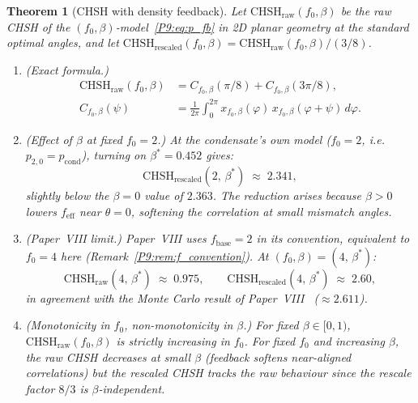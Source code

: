 \documentclass[11pt,a4paper]{article}
\newtheorem{theorem}{Theorem}[section]
\theoremstyle{definition}
\theoremstyle{remark}
\newcommand{\bst}{\beta^{*}}
\newcommand{\pcond}{p_{\mathrm{cond}}}
\newcommand{\CHSH}{\mathrm{CHSH}}
\begin{document}
\begin{theorem}[CHSH with density feedback]
\label{P9:thm:chsh_fb}
Let $\CHSH_\mathrm{raw}(f_0,\beta)$ be the raw CHSH of the
$(f_0,\beta)$-model~\eqref{P9:eq:p_fb} in 2D planar geometry at the
standard optimal angles, and let
$\CHSH_\mathrm{rescaled}(f_0,\beta) = \CHSH_\mathrm{raw}(f_0,\beta)/(3/8)$.
 
\begin{enumerate}[label=\emph{(\roman*)}]
\item \emph{(Exact formula.)}
  \begin{align}
    \CHSH_\mathrm{raw}(f_0,\beta)
    &= C_{f_0,\beta}(\pi/8) + C_{f_0,\beta}(3\pi/8),
    \label{P9:eq:chsh_fb_formula}\\
    C_{f_0,\beta}(\psi)
    &= \frac{1}{2\pi}\int_0^{2\pi}
       x_{f_0,\beta}(\varphi)\,x_{f_0,\beta}(\varphi+\psi)\,d\varphi.
    \nonumber
  \end{align}
 
\item \emph{(Effect of $\beta$ at fixed $f_0=2$.)}\label{P9:item:beta_effect}
  At the condensate's own model ($f_0=2$, i.e.\ $p_{2,0}=\pcond$),
  turning on $\beta^*=0.452$ gives:
  \begin{equation}
    \CHSH_\mathrm{rescaled}(2,\,\bst)
    \;\approx\; 2.341,
    \label{P9:eq:chsh_beta_pcond}
  \end{equation}
  slightly \emph{below} the $\beta=0$ value of $2.363$.
  The reduction arises because $\beta>0$ lowers $f_\mathrm{eff}$
  near $\theta=0$, softening the correlation at small mismatch angles.
 
\item \emph{(Paper~VIII limit.)}
  Paper~VIII uses $f_\mathrm{base}=2$ in its convention, equivalent to
  $f_0=4$ here (Remark~\ref{P9:rem:f_convention}).
  At $(f_0,\beta) = (4,\,\bst)$:
  \begin{equation}
    \CHSH_\mathrm{raw}(4,\,\bst) \;\approx\; 0.975,
    \qquad
    \CHSH_\mathrm{rescaled}(4,\,\bst) \;\approx\; 2.60,
    \label{P9:eq:chsh_paper8}
  \end{equation}
  in agreement with the Monte Carlo result of
  Paper~VIII~\cite{Paper8} ($\approx2.611$).
 
\item \emph{(Monotonicity in $f_0$, non-monotonicity in $\beta$.)}\label{P9:item:monotone_fb}
  For fixed $\beta\in[0,1)$, $\CHSH_\mathrm{raw}(f_0,\beta)$ is
  strictly increasing in $f_0$.
  For fixed $f_0$ and increasing $\beta$, the raw CHSH \emph{decreases}
  at small $\beta$ (feedback softens near-aligned correlations) but the
  rescaled CHSH tracks the raw behaviour since the rescale factor $8/3$
  is $\beta$-independent.
\end{enumerate}
\end{theorem}
 
\end{document}
